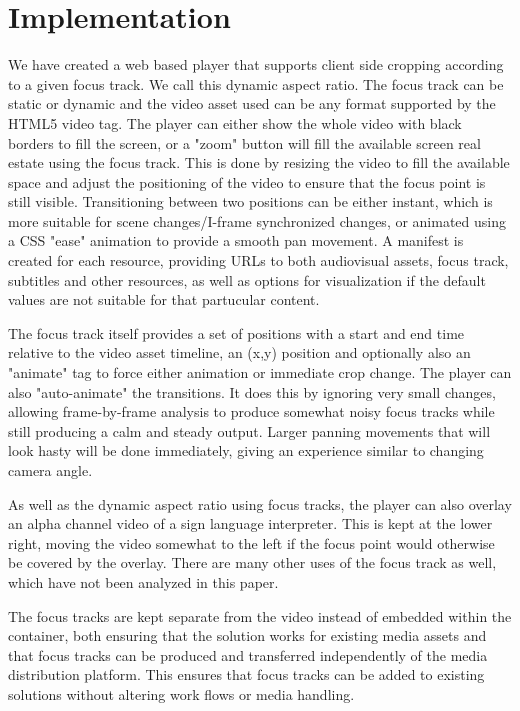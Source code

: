 \documentclass[sigconf, review=true]{acmart}
\begin{document}
\section{Implementation}

We have created a web based player that supports client side cropping
according to a given focus track. We call this dynamic aspect ratio. The
focus track can be static or dynamic and the video asset used can be any
format supported by the HTML5 video tag. The player can either show the whole
video with black borders to fill the screen, or a "zoom" button will fill the
available screen real estate using the focus track. This is done by resizing
the video to fill the available space and adjust the positioning of the video
to ensure that the focus point is still visible. Transitioning between two
positions can be either instant, which is more suitable for scene
changes/I-frame synchronized changes, or animated using a CSS "ease"
animation to provide a smooth pan movement. A manifest is created for each
resource, providing URLs to both audiovisual assets, focus track, subtitles
and other resources, as well as options for visualization if the default
values are not suitable for that partucular content.

The focus track itself provides a set of positions with a start and end time
relative to the video asset timeline, an (x,y) position and optionally also
an "animate" tag to force either animation or immediate crop change. The
player can also "auto-animate" the transitions. It does this by ignoring very
small changes, allowing frame-by-frame analysis to produce somewhat noisy
focus tracks while still producing a calm and steady output. Larger panning
movements that will look hasty will be done immediately, giving an experience
similar to changing camera angle.

As well as the dynamic aspect ratio using focus tracks, the player can also
overlay an alpha channel video of a sign language interpreter. This is kept
at the lower right, moving the video somewhat to the left if the focus point
would otherwise be covered by the overlay. There are many other uses of the
focus track as well, which have not been analyzed in this paper.

The focus tracks are kept separate from the video instead of embedded within
the container, both ensuring that the solution works for existing media
assets and that focus tracks can be produced and transferred independently of
the media distribution platform. This ensures that focus tracks can be added
to existing solutions without altering work flows or media handling.
\end{document}
